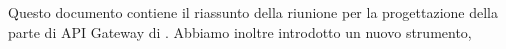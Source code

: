 Questo documento contiene il riassunto della riunione per la progettazione della parte di API Gateway di \progetto. Abbiamo inoltre introdotto un nuovo strumento,